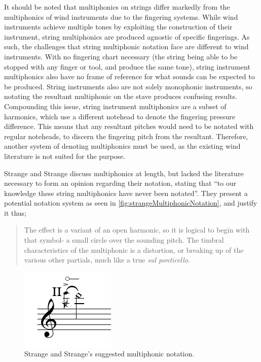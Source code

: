 It should be noted that multiphonics on strings differ markedly from the multiphonics of wind instruments due to the fingering systems.\label{sec:multiphonicsWoodwind}
While wind instruments achieve multiple tones by exploiting the construction of their instrument, string multiphonics are produced agnostic of specific fingerings.
As such, the challenges that string multiphonic notation face are different to wind instruments.
With no fingering chart necessary (the string being able to be stopped with any finger or tool, and produce the same tone), string instrument multiphonics also have no frame of reference for what sounds can be expected to be produced.
String instruments also are not solely monophonic instruments, so notating the resultant multiphonic on the stave produces confusing results.
Compounding this issue, string instrument multiphonics are a subset of harmonics, which use a different notehead to denote the fingering pressure difference.
This means that any resultant pitches would need to be notated with regular noteheads, to discern the fingering pitch from the resultant.
Therefore, another system of denoting multiphonics must be used, as the existing wind literature is not suited for the purpose.

Strange and Strange discuss multiphonics at length, but lacked the literature necessary to form an opinion regarding their notation, stating that ``to our knowledge these string multiphonics have never been notated''.\autocite[132--134]{strangeContemporaryViolinExtended2001}
They present a potential notation system as seen in \autoref{fig:strangeMultiphonicNotation}, and justify it thus;

\begin{quote}
  The effect is a variant of an open harmonic, so it is logical to begin with that symbol- a small circle over the sounding pitch. 
  The timbral characteristics of the multiphonic is a distortion, or breaking up of the various other partials, much like a true \emph{sul ponticello}.\autocite[134]{strangeContemporaryViolinExtended2001}
\end{quote}

  \begin{figure}
    \centering
    \includegraphics{./resources/strangeMultiphonicNotation.pdf}
    \caption{Strange and Strange's suggested multiphonic notation.}\label{fig:strangeMultiphonicNotation}\end{figure}

